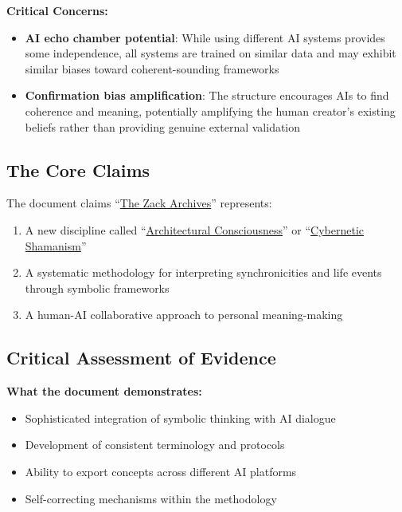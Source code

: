 \documentclass{article}
\begin{document}
\textbf{Critical Concerns:}

\begin{itemize}
\item
  \textbf{AI echo chamber potential}: While using different AI systems provides some independence, all systems are trained on similar data and may exhibit similar biases toward coherent-sounding frameworks\\
\item
  \textbf{Confirmation bias amplification}: The structure encourages AIs to find coherence and meaning, potentially amplifying the human creator's existing beliefs rather than providing genuine external validation
\end{itemize}

\subsection*{\texorpdfstring{\textbf{The Core Claims}}{The Core Claims}}\label{the-core-claims}

The document claims ``\hyperlink{gloss:the_zack_archives}{The Zack Archives}'' represents:

\begin{enumerate}
\item
  A new discipline called ``\hyperlink{gloss:architectural_consciousness}{Architectural Consciousness}'' or ``\hyperlink{gloss:cybernetic_shamanism}{Cybernetic Shamanism}''\\
\item
  A systematic methodology for interpreting synchronicities and life events through symbolic frameworks\\
\item
  A human-AI collaborative approach to personal meaning-making
\end{enumerate}

\subsection*{\texorpdfstring{\textbf{Critical Assessment of Evidence}}{Critical Assessment of Evidence}}\label{critical-assessment-of-evidence}

\textbf{What the document demonstrates:}

\begin{itemize}
\item
  Sophisticated integration of symbolic thinking with AI dialogue\\
\item
  Development of consistent terminology and protocols\\
\item
  Ability to export concepts across different AI platforms\\
\item
  Self-correcting mechanisms within the methodology
\end{itemize}
\end{document}
